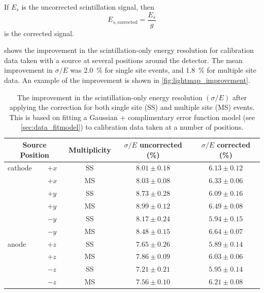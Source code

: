 \documentclass[herrin-thesis.tex]{subfiles}
\begin{document}
If \(E_{s}\) is the uncorrected scintillation signal, then
\begin{equation}
E_{s,\text{corrected}} = \frac{E_s}{g}
\label{eq:lightmap_corrected_signal}
\end{equation}
is the corrected signal.

 shows the improvement in the scintillation-only energy resolution for calibration data taken with a  source at several positions around the detector. The mean improvement in \(\sigma/E\) was \SI{2.0}{\percent} for single site events, and \SI{1.8}{\percent} for multiple site data. An example of the improvement is shown in \cref{fig:lightmap_improvement}.

\begin{table}[htbp]
\centering
\caption[Resolution improvement due to correction]{The improvement in the scintillation-only energy resolution \((\sigma/E)\) after applying the correction for both single site (SS) and multiple site (MS) events. This is based on fitting a Gaussian + complimentary error function model (see \ref{sec:data_fitmodel}) to  calibration data taken at a number of positions.}
\label{tab:lightmap_effect}
\begin{tabular}{l l c c c}\toprule
\multicolumn{2}{c}{Source Position}	&	Multiplicity	&	\(\sigma/E\) uncorrected (\%)	&	\(\sigma/E\) corrected (\%)		\\\midrule
cathode	&	\(+x\)				&	SS			&	\(8.01\pm0.18\)					&	\(6.13\pm0.12\)					\\
		&	\(+x\)				&	MS			&	\(8.03\pm0.08\)					&	\(6.33\pm0.06\)					\\
		&	\(+y\)				&	SS			&	\(8.73\pm0.28\)					&	\(6.09\pm0.16\)					\\
		&	\(+y\)				&	MS			&	\(8.99\pm0.12\)					&	\(6.49\pm0.08\)					\\
		&	\(-y\)				&	SS			&	\(8.17\pm0.24\)					&	\(5.94\pm0.15\)					\\
		&	\(-y\)				&	MS			&	\(8.48\pm0.15\)					&	\(6.64\pm0.07\)					\\
anode	&	\(+z\)				&	SS			&	\(7.65\pm0.26\)					&	\(5.89\pm0.14\)					\\
		&	\(+z\)				&	MS			&	\(7.86\pm0.09\)					&	\(6.03\pm0.06\)					\\
		&	\(-z\)				&	SS			&	\(7.21\pm0.21\)					&	\(5.95\pm0.14\)					\\
		&	\(-z\)				&	MS			&	\(7.56\pm0.10\)					&	\(6.21\pm0.08\)					\\\bottomrule
\end{tabular}
\end{table}
\end{document}
